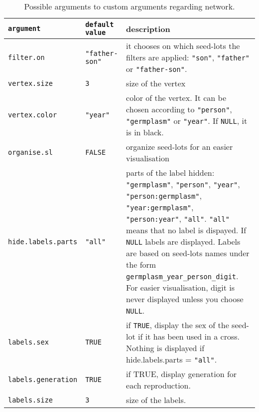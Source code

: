 \documentclass{article}\usepackage[]{graphicx}\usepackage[]{color}
\begin{document}
\begin{center}
\begin{table}[H]
\begin{tabular}{ p{} p{} p{} }
\hline
\texttt{argument} & \texttt{default value} & description \\
\hline

\texttt{filter.on} & \texttt{"father-son"} & it chooses on which seed-lots the filters are applied: \texttt{"son"}, \texttt{"father"} or \texttt{"father-son"}. \\

\texttt{vertex.size} & \texttt{3} &  size of the vertex \\

\texttt{vertex.color} & \texttt{"year"} & color of the vertex. 
It can be chosen according to  \texttt{"person"}, \texttt{"germplasm"} or \texttt{"year"}. 
If \texttt{NULL}, it is in black. \\

\texttt{organise.sl} & \texttt{FALSE} & organize seed-lots for an easier visualisation \\

\texttt{hide.labels.parts} & \texttt{"all"} & parts of the label hidden: \texttt{"germplasm"}, \texttt{"person"}, \texttt{"year"}, \texttt{"person:germplasm"}, \texttt{"year:germplasm"}, \texttt{"person:year"}, \texttt{"all"}. 
\texttt{"all"} means that no label is dispayed. 
If \texttt{NULL} labels are displayed. Labels are based on seed-lots names under the form \texttt{germplasm\_year\_person\_digit}.
For easier visualisation, digit is never displayed unless you choose \texttt{NULL}.
\\

\texttt{labels.sex} & \texttt{TRUE} & if \texttt{TRUE}, display the sex of the seed-lot if it has been used in a cross. Nothing is displayed if hide.labels.parts = \texttt{"all"}. \\

\texttt{labels.generation} & \texttt{TRUE} & if TRUE, display generation for each reproduction. \\

\texttt{labels.size} & \texttt{3} & size of the labels. \\
\hline
\end{tabular}
\caption{Possible arguments to custom arguments regarding network.}
\label{custom.network}
\end{table}
\end{center}
\end{document}
